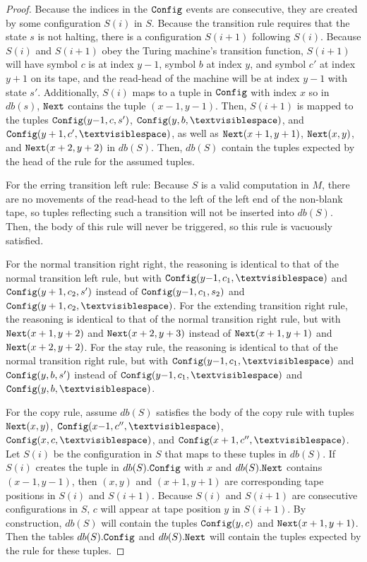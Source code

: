 \begin{proof}
Because the indices in the $\texttt{Config}$ events are consecutive,
they are created by some configuration $S(i)$ in $S$.
Because the transition rule requires that the state $s$ is not halting,
there is a configuration $S(i+1)$ following $S(i)$.
Because $S(i)$ and $S(i+1)$ obey the Turing machine's transition function,
$S(i+1)$ will have
symbol $c$ is at index $y{-}1$,
symbol $b$ at index $y$,
and symbol $c'$ at index $y+1$ on its tape,
and the read-head of the machine will be at index $y{-}1$ with state $s'$.
Additionally, $S(i)$ maps to a tuple in $\texttt{Config}$ with index $x$
so in $db(s)$, $\texttt{Next}$ contains the tuple $(x{-}1,y{-}1)$.
Then, $S(i+1)$ is mapped to the tuples
$\texttt{Config}(y{-}1,c,s')$,
$\Config(y,b,\blank)$,
and $\Config(y+1,c',\blank)$,
as well as
$\texttt{Next}(x+1,y+1)$,
$\texttt{Next}(x,y)$,
and $\texttt{Next}(x+2,y+2)$ in $db(S)$.
Then, $db(S)$ contain the tuples expected by the head
of the rule for the assumed tuples.

For the erring transition left rule:
Because $S$ is a valid computation in $M$,
there are no movements of the read-head to the left of the left end of the non-blank tape,
so tuples reflecting such a transition will not be inserted into $db(S)$.
Then, the body of this rule will never be triggered,
so this rule is vacuously satisfied.

For the normal transition right right,
the reasoning is identical to that of the normal transition left rule,
but with $\Config(y{-}1, c_1, \blank)$ and $\texttt{Config}(y+1, c_2, s')$
instead of $\texttt{Config}(y{-}1,c_1,s_2)$ and $\Config(y+1,c_2,\blank)$.
For the extending transition right rule,
the reasoning is identical to that of the normal transition right rule,
but with $\texttt{Next}(x+1, y+2)$ and $\texttt{Next}(x+2, y+3)$
instead of $\texttt{Next}(x+1,y+1)$ and $\texttt{Next}(x+2,y+2)$.
For the stay rule,
the reasoning
is identical to that of the normal transition right rule,
but with $\Config(y{-}1, c_1, \blank)$ and $\texttt{Config}(y, b, s')$
instead of $\Config(y{-}1,c_1,\blank)$ and $\Config(y,b,\blank)$.

For the copy rule,
assume $db(S)$ satisfies the body of the copy rule with tuples
$\texttt{Next}(x,y)$,
$\Config(x{-}1,c'',\blank)$,
$\Config(x,c,\blank)$,
and $\Config(x+1,c'',\blank)$.
Let $S(i)$ be the configuration in $S$ that maps to these tuples in $db(S)$.
If $S(i)$ creates the tuple in $db(S).\texttt{Config}$ with $x$
and $db(S).\texttt{Next}$ contains $(x{-}1,y{-}1)$,
then $(x, y)$ and $(x+1, y+1)$ are corresponding tape positions in $S(i)$ and $S(i+1)$.
Because $S(i)$ and $S(i+1)$ are consecutive configurations in $S$,
$c$ will appear at tape position $y$ in $S(i+1)$.
By construction, $db(S)$ will contain the tuples $\texttt{Config}(y,c)$
and $\texttt{Next}(x+1, y+1)$.
Then the tables $db(S).\texttt{Config}$ and $db(S).\texttt{Next}$ will contain the tuples expected by the rule for these tuples.


\end{proof}
